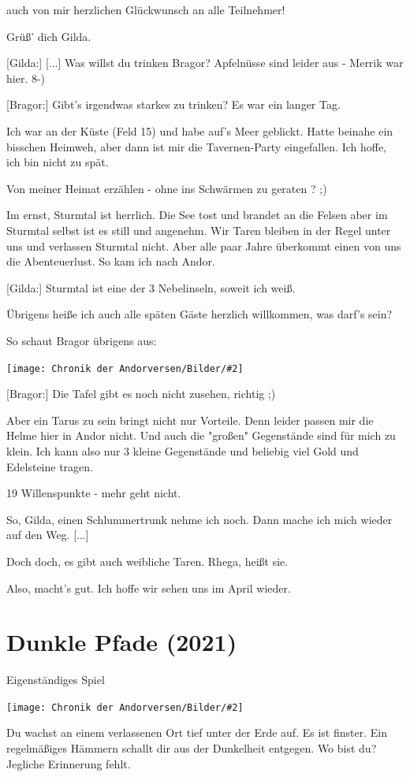 \documentclass[10pt, a4paper, oneside]{book}
\newcommand{\produkt}[1]{%
    \section{#1}%
    \label{Produkt: #1}%
}
\newcommand{\bildmitts}[2][height=0.32\textwidth,width=0.48\textwidth,keepaspectratio]{%
    \begin{center}
        \texttt{[image: Chronik der Andorversen/Bilder/\#2]}
    \end{center}
}
\begin{document}
\begin{multicols}{2}
auch von mir herzlichen Glückwunsch an alle Teilnehmer!

Grüß' dich Gilda.

[Gilda:] [...] Was willst du trinken Bragor? Apfelnüsse sind leider aus - Merrik war hier. 8-)

[Bragor:] Gibt's irgendwas starkes zu trinken? Es war ein langer Tag.

Ich war an der Küste (Feld 15) und habe auf's Meer geblickt. Hatte beinahe ein bisschen Heimweh, aber dann ist mir die Tavernen-Party eingefallen. Ich hoffe, ich bin nicht zu spät.

Von meiner Heimat erzählen - ohne ins Schwärmen zu geraten ? ;)

Im ernst, Sturmtal ist herrlich. Die See tost und brandet an die Felsen aber im Sturmtal selbst ist es still und angenehm. Wir Taren bleiben in der Regel unter uns und verlassen Sturmtal nicht. Aber alle paar Jahre überkommt einen von uns die Abenteuerlust. So kam ich nach Andor.

[Gilda:] Sturmtal ist eine der 3 Nebelinseln, soweit ich weiß.

Übrigens heiße ich auch alle späten Gäste herzlich willkommen, was darf's sein?

So schaut Bragor übrigens aus:

\bildmitts{Bragor.jpeg}

[Bragor:] Die Tafel gibt es noch nicht zusehen, richtig ;)

Aber ein Tarus zu sein bringt nicht nur Vorteile. Denn leider passen mir die Helme hier in Andor nicht. Und auch die "großen" Gegenstände sind für mich zu klein. Ich kann also nur 3 kleine Gegenstände und beliebig viel Gold und Edelsteine tragen.

19 Willenspunkte - mehr geht nicht.

So, Gilda, einen Schlummertrunk nehme ich noch. Dann mache ich mich wieder auf den Weg. [...]

Doch doch, es gibt auch weibliche Taren. Rhega, heißt sie.

Also, macht's gut. Ich hoffe wir sehen uns im April wieder.


\produkt{Dunkle Pfade (2021)}

\begin{center} 
    Eigenständiges Spiel
\end{center}

\bildmitts{Dunkle Pfade (2021).png}

Du wachst an einem verlassenen Ort tief unter der Erde auf. Es ist finster. Ein regelmäßiges Hämmern schallt dir aus der Dunkelheit entgegen. Wo bist du? Jegliche Erinnerung fehlt.


\end{multicols}
\end{document}
